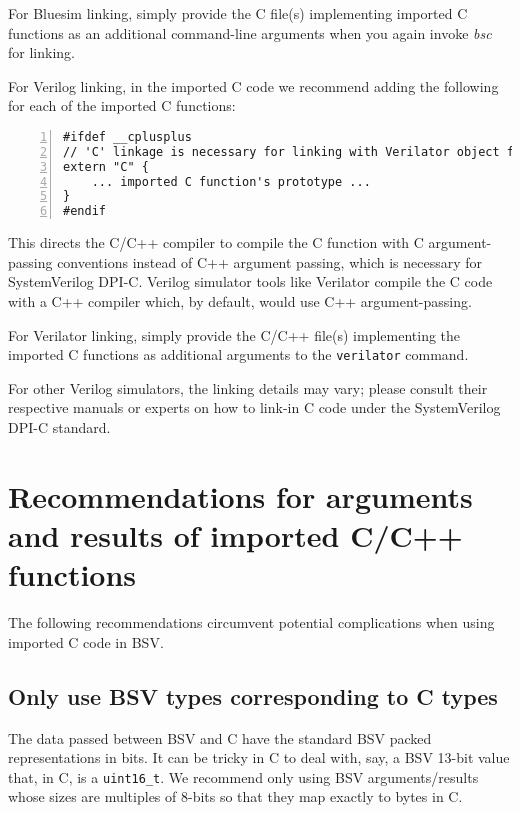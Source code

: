 For Bluesim linking, simply provide the C file(s) implementing
imported C functions as an additional command-line arguments when you
again invoke \emph{bsc} for linking.

For Verilog linking, in the imported C code we recommend adding the
following for each of the imported C functions:

{\small
\begin{Verbatim}[frame=single, numbers=left]
#ifdef __cplusplus
// 'C' linkage is necessary for linking with Verilator object files
extern "C" {
    ... imported C function's prototype ...
}
#endif
\end{Verbatim}
}

This directs the C/C++ compiler to compile the C function with C
argument-passing conventions instead of C++ argument passing, which is
necessary for SystemVerilog DPI-C.  Verilog simulator tools like
Verilator compile the C code with a C++ compiler which, by default,
would use C++ argument-passing.

For Verilator linking, simply provide the C/C++ file(s) implementing
the imported C functions as additional arguments to the
\verb|verilator| command.

For other Verilog simulators, the linking details may vary; please
consult their respective manuals or experts on how to link-in C code
under the SystemVerilog DPI-C standard.


\section{Recommendations for arguments and results of imported C/C++ functions}

The following recommendations circumvent potential complications when
using imported C code in BSV.


\subsection{Only use BSV types corresponding to C types}

The data passed between BSV and C have the standard BSV packed
representations in bits.  It can be tricky in C to deal with, say, a
BSV 13-bit value that, in C, is a \verb|uint16_t|.  We recommend only
using BSV arguments/results whose sizes are multiples of 8-bits so
that they map exactly to bytes in C.

